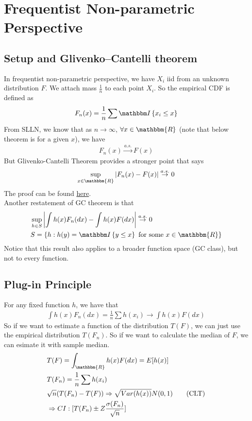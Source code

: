 \section{Frequentist Non-parametric Perspective} 

\subsection{Setup and Glivenko–Cantelli theorem}
In frequentist non-parametric perspective, we have $X_i$ iid from an unknown distribution $F$. We attach mass $\frac{1}{n}$ to each point $X_i$. So the empirical CDF is defined as 
    \begin{align*}
        F_n(x) = \frac{1}{n} \sum \indic{x_i \leq x}
    \end{align*}
From SLLN, we know that as $n \to \infty$, $\forall x\in \mathbbm{R}$ (note that below theorem is for a given $x$), we have
    \begin{align*}
        F_n(x) \overset{a.s.}{\to} F(x) 
    \end{align*}
But Glivenko-Cantelli Theorem provides a stronger point that says 
    \begin{align*}
        \sup_{x \in \mathbbm{R}}\abs{F_n(x) - F(x)} \overset{a.s.}{\to} 0
    \end{align*}
The proof can be found \href{chrome-extension://efaidnbmnnnibpcajpcglclefindmkaj/https://home.uchicago.edu/~amshaikh/webfiles/glivenko-cantelli.pdf}{here}. \\

Another restatement of GC theorem is that 
    \begin{align*}
        & \sup_{h \in S} \abs{\int h(x) F_n(dx) - \int h(x) F(dx)} \overset{a.s.}{\to} 0 \\
        & S = \{ h: h(y) = \indic{y \leq x} \text{ for some } x \in \mathbbm{R} \}
    \end{align*}
Notice that this result also applies to a broader function space (GC class), but not to every function. 

\subsection{Plug-in Principle}
For any fixed function $h$, we have that 
    \begin{align*}
        \int h(x) F_n(dx) = \frac{1}{n} \sum h(x_i) \to \int h(x)F(dx)
    \end{align*}
So if we want to estimate a function of the distribution $T(F)$, we can just use the empirical distribution $T(F_n)$. So if we want to calculate the median of $F$, we can esimate it with sample median. 
    \begin{align*}
        & T(F) = \int_{\mathbbm{R}} h(x) F(dx) = E[h(x)] \\
        & T(F_n) = \frac{1}{n} \sum h(x_i) \\
        & \sqrt{n} (T(F_n) - T(F)) \Rightarrow \sqrt{Var(h(x))}N(0,1) \tag{CLT} \\
        & \Rightarrow CI: [T(F_n) \pm Z \frac{\sigma(F_n)}{\sqrt{n}}]
    \end{align*}


